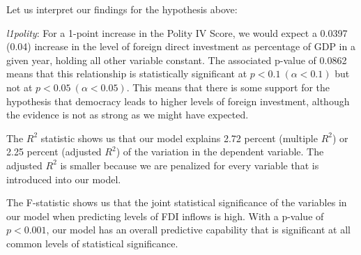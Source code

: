 \documentclass[12pt]{article}\usepackage[]{graphicx}\usepackage[]{color}
\begin{document}
Let us interpret our findings for the hypothesis above:

\textit{l1polity}: For a 1-point increase in the Polity IV Score, we would expect a 0.0397 (0.04) increase in the level of foreign direct investment as percentage of GDP in a given year, holding all other variable constant. The associated p-value of 0.0862 means that this relationship is statistically significant at $p < 0.1 \ (\alpha < 0.1)$ but not at $p < 0.05 \ (\alpha < 0.05)$. This means that there is some support for the hypothesis that democracy leads to higher levels of foreign investment, although the evidence is not as strong as we might have expected.

The $R^2$ statistic shows us that our model explains 2.72 percent (multiple $R^2$) or 2.25 percent (adjusted $R^2$) of the variation in the dependent variable. The adjusted $R^2$ is smaller because we are penalized for every variable that is introduced into our model.

The F-statistic shows us that the joint statistical significance of the variables in our model when predicting levels of FDI inflows is high. With a p-value of $p < 0.001$, our model has an overall predictive capability that is significant at all common levels of statistical significance.
\end{document}
